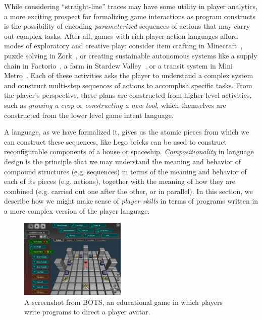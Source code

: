 
While considering ``straight-line'' traces may have some utility in player
analytics, a more exciting prospect for formalizing game interactions as
program constructs is the possibility of
encoding {\em parameterized} sequences of actions that may carry out
complex tasks. After all, games with rich player action languages afford
modes of exploratory and creative play: consider item crafting in
Minecraft~\cite{minecraft}, puzzle solving in Zork~\cite{blank1980zork}, or
creating sustainable autonomous systems like a supply chain in
Factorio~\cite{factorio}, a farm in Stardew Valley~\cite{stardew}, or a
transit system in Mini Metro~\cite{minimetro}.  Each of these activities
asks the player to understand a complex system and construct multi-step
sequences of actions to accomplish specific tasks. From the player's
perspective, these plans are constructed from higher-level activities,
such as {\em growing a crop} or {\em constructing a new tool}, which
themselves are constructed from the lower level game intent language.

A language, as we have formalized it, gives us the atomic pieces from which
we can construct these sequences, like Lego bricks can be used to construct
reconfigurable components of a house or spaceship. {\em Compositionality}
in language design is the principle that we may understand the meaning and
behavior of compound structures (e.g. sequences) in terms of the meaning
and behavior of each of its pieces (e.g. actions), together with the
meaning of how they are combined (e.g. carried out one after the other, or
in parallel). In this section, we describe how we might make sense of {\em
player skills} in terms of programs written in a more complex version of
the player language.

\begin{figure}
  \includegraphics[width=0.45\textwidth]{bots.png}
  \caption{A screenshot from BOTS, an educational game in which players
  write programs to direct a player avatar.}
  \label{fig:bots}
\end{figure}


